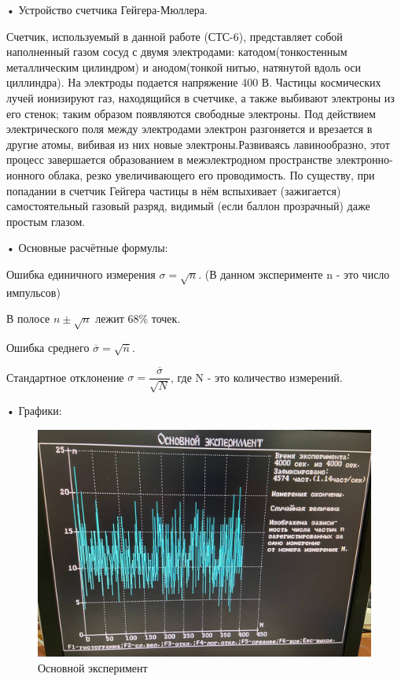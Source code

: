 	
	• Устройство счетчика Гейгера-Мюллера.
	\newline
	
	Счетчик, используемый в данной работе (СТС-6), представляет собой  наполненный газом сосуд с двумя электродами:
	катодом(тонкостенным металлическим цилиндром) и анодом(тонкой нитью, натянутой вдоль оси циллиндра).
	На электроды подается напряжение 400 В.
	Частицы космических лучей ионизируют газ, находящийся в счетчике, а также выбивают электроны из его стенок; таким образом появляются свободные электроны. Под действием электрического поля между электродами электрон разгоняется и врезается в другие атомы, вибивая из них новые электроны.Развиваясь лавинообразно, этот процесс завершается образованием в межэлектродном пространстве электронно-ионного облака, резко увеличивающего его проводимость. По
	существу, при попадании в счетчик Гейгера частицы в нём вспыхивает (зажигается) самостоятельный
	газовый разряд, видимый (если баллон прозрачный) даже простым глазом.
	\newline
	
	
	
	
	• Основные расчётные формулы:
	\newline
	
	Ошибка единичного измерения $\sigma = \sqrt{n}$. (В данном эксперименте n - это число импульсов)
	
	В полосе $n\pm\sqrt{n}$ лежит 68\% точек.
	
	Ошибка среднего $\overline{\sigma} = \sqrt{\overline{n}}$.
	
	Стандартное отклонение $\sigma = \dfrac{\overline{\sigma}}{\sqrt{N}}$, где N - это количество измерений.
	\newline
	

	\newpage
	• Графики:
	\newline
	
	\begin{figure}
		\includegraphics[width=\linewidth ]{1}
		\caption{Основной эксперимент}
	\end{figure}

